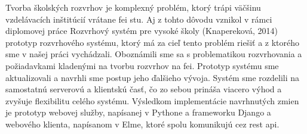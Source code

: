 Tvorba školských rozvrhov je komplexný problém, ktorý trápi väčšinu vzdelávacích
inštitúcií vrátane \acrshort{fei} \acrshort{stu}. Aj z tohto dôvodu vznikol v
rámci diplomovej práce Rozvrhový systém pre vysoké školy (Knapereková, 2014)
prototyp rozvrhového systému, ktorý má za cieľ tento problém riešiť a z ktorého
sme v našej práci vychádzali. Oboznámili sme sa s problematikou rozvrhovania a
požiadavkami kladenými na tvorbu rozvrhov na \acrshort{fei}. Prototyp systému
sme aktualizovali a navrhli sme postup jeho ďalšieho vývoja. Systém sme
rozdelili na samostatnú serverovú a klientskú časť, čo zo sebou prináša viacero
výhod a zvyšuje flexibilitu celého systému. Výsledkom implementácie navrhnutých
zmien je prototyp webovej služby, napísanej v Pythone a frameworku Django a
webového klienta, napísanom v Elme, ktoré spolu komunikujú cez \acrshort{rest}
\acrshort{api}.
